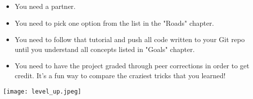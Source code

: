 \documentclass{42-en}
\begin{document}
\begin{itemize}

  \item You need a partner.

  \item You need to pick one option from the list in the "Roads" chapter.

  \item You need to follow that tutorial and push all code written to your Git repo until you understand all concepts listed in "Goals" chapter.

  \item You need to have the project graded through peer corrections in order to get credit. It's a fun way to compare the craziest tricks that you learned!

\end{itemize}

\texttt{[image: level\_up.jpeg]}

\end{document}

